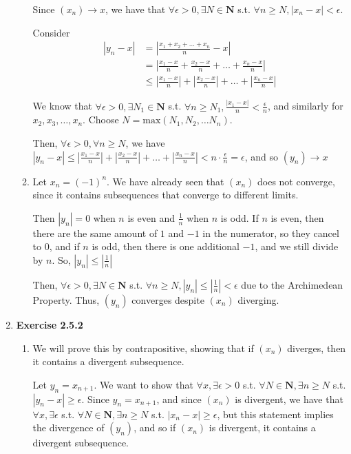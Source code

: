 \documentclass{article}
\begin{document}
\begin{enumerate}
\begin{enumerate}
            Since $(x_n) \rightarrow x$, we have that $\forall \epsilon > 0, \exists N \in \mathbf{N}$ s.t. $\forall n \geq N, |x_n - x| < \epsilon$. 

            Consider \begin{align*}
                |y_n - x| &= \left|\frac{x_1 + x_2 + \dots + x_n}{n} - x\right| \\
                &= \left|\frac{x_1 - x}{n} + \frac{x_2 - x}{n} + \dots + \frac{x_n - x}{n}\right| \\
                &\leq \left|\frac{x_1 - x}{n}\right| + \left|\frac{x_2 - x}{n}\right| + \dots + \left|\frac{x_n - x}{n}\right|
            \end{align*}

            We know that $\forall \epsilon > 0, \exists N_1 \in \mathbf{N}$ s.t. $\forall n \geq N_1, \frac{|x_1 - x|}{n} < \frac{\epsilon}{n}$, and similarly for $x_2, x_3, \dots, x_n$. Choose $N = \text{max}(N_1, N_2, \dots N_n)$.

            Then, $\forall \epsilon > 0, \forall n \geq N$, we have $|y_n - x| \leq \left|\frac{x_1 - x}{n}\right| + \left|\frac{x_2 - x}{n}\right| + \dots + \left|\frac{x_n - x}{n}\right| < n \cdot \frac{\epsilon}{n} = \epsilon$, and so $(y_n) \rightarrow x$

            \item Let $x_n = (-1)^n$. We have already seen that $(x_n)$ does not converge, since it contains subsequences that converge to different limits. 
            
            Then $|y_n| = 0$ when $n$ is even and $\frac{1}{n}$ when $n$ is odd. If $n$ is even, then there are the same amount of $1$ and $-1$ in the numerator, so they cancel to 0, and if $n$ is odd, then there is one additional $-1$, and we still divide by $n$. So, $|y_n| \leq |\frac{1}{n}|$

            Then, $\forall \epsilon > 0, \exists N \in \mathbf{N}$ s.t. $\forall n \geq N, |y_n| \leq |\frac{1}{n}| < \epsilon$ due to the Archimedean Property. Thus, $(y_n)$ converges despite $(x_n)$ diverging. 
        \end{enumerate}
    \item \textbf{Exercise 2.5.2}
        \begin{enumerate}
            \item We will prove this by contrapositive, showing that if $(x_n)$ diverges, then it contains a divergent subsequence. 
            
            Let $y_n = x_{n+1}$. We want to show that $\forall x, \exists \epsilon > 0$ s.t. $\forall N \in \mathbf{N}, \exists n \geq N$ s.t. $|y_n - x| \geq \epsilon$. Since $y_n = x_{n+1}$, and since $(x_n)$ is divergent, we have that $\forall x, \exists \epsilon$ s.t. $\forall N \in \mathbf{N}, \exists n \geq N$ s.t. $|x_n - x| \geq \epsilon$, but this statement implies the divergence of $(y_n)$, and so if $(x_n)$ is divergent, it contains a divergent subsequence. 


\end{enumerate}
\end{enumerate}
\end{document}
